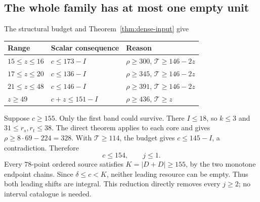 \documentclass[11pt,letterpaper]{article}
\newcommand{\card}[1]{\lvert#1\rvert}
\theoremstyle{definition}\newtheorem{definition}[theorem]{Definition}
\begin{document}
\subsection{The whole family has at most one empty unit}
The structural budget and Theorem~\ref{thm:dense-input} give
\begin{center}
\begin{tabular}{@{}lll@{}}\toprule
Range&Scalar consequence&Reason\\\midrule
$15\le z\le16$&$c\le173-I$&$\rho\ge300$, $\mathcal T\ge146-2z$\\
$17\le z\le20$&$c\le136-I$&$\rho\ge345$, $\mathcal T\ge146-2z$\\
$21\le z\le48$&$c\le146-I$&$\rho\ge391$, $\mathcal T\ge146-2z$\\
$z\ge49$&$c+z\le151-I$&$\rho\ge436$, $\mathcal T\ge z$\\\bottomrule
\end{tabular}
\end{center}
Suppose $c\ge155$. Only the first band could survive. There $I\le18$, so $k\le3$ and $31\le r_s,r_t\le38$. The direct theorem applies to each core and gives $\rho\ge8\cdot69-224=328$. With $\mathcal T\ge114$, the budget gives $c\le145-I$, a contradiction. Therefore
\begin{equation}\label{eq:h-c154}
c\le154,\qquad j\le1.
\end{equation}
Every $78$-point ordered source satisfies $K=\card{D+D}\ge155$, by the two monotone endpoint chains. Since $\delta\le c<K$, neither leading resource can be empty. Thus both leading shifts are integral. This reduction directly removes every $j\ge2$; no interval catalogue is needed.
\end{document}
